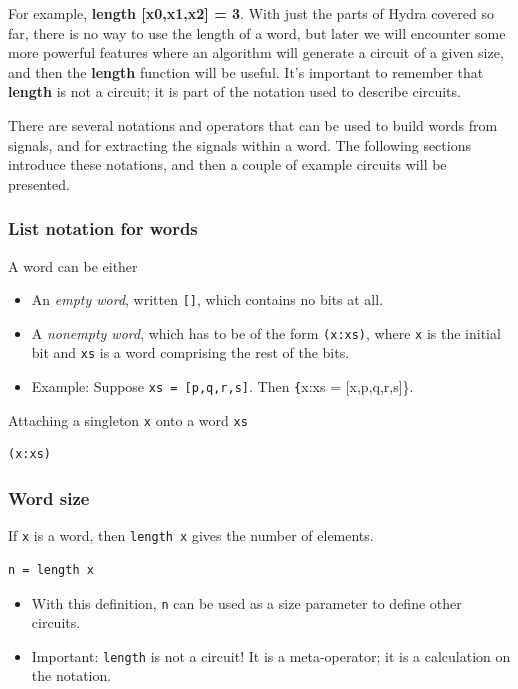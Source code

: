 \documentclass[]{svmono}
\begin{document}
For example, \textbf{length [x0,x1,x2] = 3}.  With just the parts of Hydra
covered so far, there is no way to use the length of a word, but later
we will encounter some more powerful features where an algorithm will
generate a circuit of a given size, and then the \textbf{length} function
will be useful.  It's important to remember that \textbf{length} is not a
circuit; it is part of the notation used to describe circuits.

There are several notations and operators that can be used to build
words from signals, and for extracting the signals within a word.  The
following sections introduce these notations, and then a couple of
example circuits will be presented.
\subsubsection*{List notation for words}
\label{sec:org1af0a3a}

A word can be either

\begin{itemize}
\item An \emph{empty word}, written \texttt{[]}, which contains no
bits at all.
\item A \emph{nonempty word}, which has to be of the form
\texttt{(x:xs)}, where \texttt{x} is the initial bit and
\texttt{xs} is a word comprising the rest of the bits.
\item Example: Suppose \texttt{xs = [p,q,r,s]}.  Then \texttt\{x:xs
= [x,p,q,r,s]\}.
\end{itemize}

Attaching a singleton \texttt{x} onto a word \texttt{xs}

\begin{verbatim}
(x:xs)
\end{verbatim}
\subsubsection*{Word size}
\label{sec:org2314d9b}

If \texttt{x} is a word, then \texttt{length x} gives the number
of elements.

\begin{verbatim}
n = length x
\end{verbatim}

\begin{itemize}
\item With this definition, \texttt{n} can be used as a size
parameter to define other circuits.
\item Important: \texttt{length} is not a circuit!  It is a
meta-operator; it is a calculation on the notation.
\end{itemize}
\end{document}
